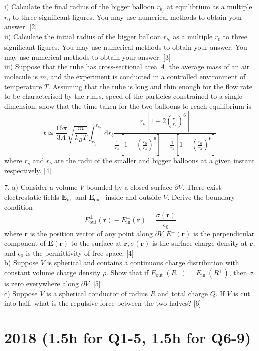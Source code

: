 \documentclass{article}
\begin{document}
i) Calculate the final radius of the bigger balloon $r_{b_{f}}$ at equilibrium as a multiple $r_{0}$ to three significant figures. You may use numerical methods to obtain your answer. [2] \\
ii) Calculate the initial radius of the bigger balloon $r_{b_{i}}$ as a multiple $r_{0}$ to three significant figures. You may use numerical methods to obtain your answer. You may use numerical methods to obtain your answer. [3] \\
iii) Suppose that the tube has cross-sectional area $A$, the average mass of an air molecule is $m$, and the experiment is conducted in a controlled environment of temperature $T$. Assuming that the tube is long and thin enough for the flow rate to be characterised by the r.m.s. speed of the particles constrained to a single dimension, show that the time taken for the two balloons to reach equilibrium is
$$
t \simeq \frac{16 \pi}{3 A} \sqrt{\frac{m}{k_{B} T}} \int_{r_{b_{i}}}^{r_{b_{f}}} \mathrm{~d} r_{b} \frac{r_{b}\left[1-2\left(\frac{r_{0}}{r_{b}}\right)^{6}\right]}{\frac{1}{r_{s}}\left[1-\left(\frac{r_{0}}{r_{s}}\right)^{6}\right]-\frac{1}{r_{b}}\left[1-\left(\frac{r_{0}}{r_{b}}\right)^{6}\right]}
$$
where $r_{s}$ and $r_{b}$ are the radii of the smaller and bigger balloons at a given instant respectively. [4]

7. a) Consider a volume $V$ bounded by a closed surface $\partial V$. There exist electrostatic fields $\mathbf{E}_{\text {in }}$ and $\mathbf{E}_{\text {out }}$ inside and outside $V$. Derive the boundary condition
$$
E_{\mathrm{out}}^{\perp}(\mathbf{r})-E_{\mathrm{in}}^{\perp}(\mathbf{r})=\frac{\sigma(\mathbf{r})}{\epsilon_{0}}
$$
where $\mathbf{r}$ is the position vector of any point along $\partial V, E^{\perp}(\mathbf{r})$ is the perpendicular component of $\mathbf{E}(\mathbf{r})$ to the surface at $\mathbf{r}, \sigma(\mathbf{r})$ is the surface charge density at $\mathbf{r}$, and $\epsilon_{0}$ is the permittivity of free space. [4] \\
b) Suppose $V$ is spherical and contains a continuous charge distribution with constant volume charge density $\rho$. Show that if $E_{\text {out }}\left(R^{-}\right)=E_{\text {in }}\left(R^{+}\right)$, then $\sigma$ is zero everywhere along $\partial V$. [5] \\
c) Suppose $V$ is a spherical conductor of radius $R$ and total charge $Q .$ If $V$ is cut into half, what is the repulsive force between the two halves? [6] 

\section{2018 (1.5h for Q1-5, 1.5h for Q6-9)}
\end{document}
